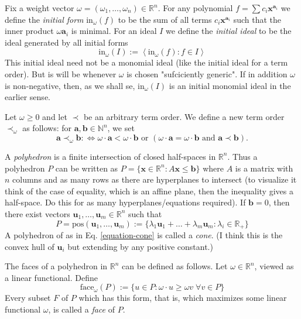 \medskip\noindent

Fix a weight vector $\omega=(\omega_1,\ldots,\omega_n)\in\mathbb{R}^n$. For any
polynomial $f=\sum c_i \mathbf{x}^{\mathbf{a}_i}$ we define the {\it initial
form} $\text{in}_\omega(f)$ to be the sum of all terms
$c_i\mathbf{x}^{\mathbf{a}_i}$ such that the inner product $\omega\mathbf{a}_i$
is minimal. For an ideal $I$ we define the {\it initial ideal} to be the ideal
generated by all initial forms
$$
\text{in}_\omega(I):=\left<\text{in}_\omega(f):f\in I\right>
$$
This initial ideal need not be a monomial ideal (like the initial ideal for a
term order). But is will be whenever $\omega$ is chosen "sufciciently generic".
If in addition $\omega$ is non-negative, then, as we shall se,
$\text{in}_\omega(I)$ is an initial monomial ideal in the earlier sense.

Let $\omega\geq 0$ and let $\prec$ be an arbitrary term order. We define a new
term order $\prec_{\omega}$ as follows: for $\mathbf{a},\mathbf{b}\in
\mathbb{N}^n$, we set
$$
\mathbf{a}\prec_\omega\mathbf{b} :\iff
\omega\cdot\mathbf{a}<\omega\cdot\mathbf{b}
\text{ or }(\omega\cdot\mathbf{a}=\omega\cdot\mathbf{b}\text{ and }
\mathbf{a}\prec \mathbf{b}).
$$
\medskip\noindent

A {\it polyhedron} is a finite intersection of closed half-spaces in
$\mathbb{R}^n$. Thus a polyhedron $P$ can be written as
$P=\{\mathbf{x}\in\mathbb{R}^n:A\mathbf{x}\leq \mathbf{b}\}$ where $A$ is a 
matrix with $n$ columns and as many rows as there are hyperplanes to intersect 
(to visualize it think of the case of equality, which is an affine
plane, then the inequality gives a half-space. Do this for as many
hyperplanes/equations required). If $\mathbf{b}=0$, then there exist vectors
$\mathbf{u}_1,\ldots,\mathbf{u}_m\in \mathbb{R}^n$ such that
\begin{equation}
\label{equation-cone}
P=\text{pos}(\mathbf{u}_1,\ldots,\mathbf{u}_m):=
\{\lambda_1\mathbf{u}_1+\ldots+\lambda_m \mathbf{u}_m
:\lambda_i \in \mathbb{R}_+\}
\end{equation}
A polyhedron of as in Eq. \ref{equation-cone} is called a {\it cone}.
(I think this is the convex hull of $\mathbf{u}_i$ but extending by any positive
constant.)

The faces of a polyhedron in $\mathbb{R}^n$ can be defined as follows. Let
$\omega\in \mathbb{R}^n$, viewed as a linear functional. Define
 $$
\text{face}_{\omega}(P):=\{u \in P:\omega\cdot u\geq \omega v \;\forall v\in P\}
$$
Every subset $F$ of $P$ which has this form, that is, which maximizes some
linear functional $\omega$, is called a {\it face} of $P$.

